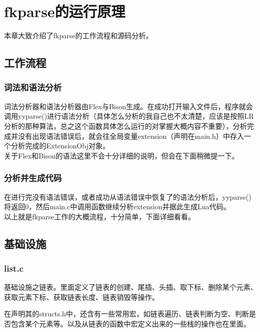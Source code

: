 \chapter{fkparse的运行原理}

本章大致介绍了fkparse的工作流程和源码分析。

\section{工作流程}

\subsection{词法和语法分析}

词法分析器和语法分析器由Flex与Bison生成。在成功打开输入文件后，程序就会调用yyparse()进行语法分析（具体怎么分析的我自己也不太清楚，应该是按照LR分析的那种算法，总之这个函数具体怎么运行的对掌握大概内容不重要），分析完成并没有出现语法错误后，就会往全局变量extension（声明在main.h）中存入一个分析完成的ExtensionObj对象。\\

关于Flex和Bison的语法这里不会十分详细的说明，但会在下面稍微提一下。

\subsection{分析并生成代码}

在进行完没有语法错误，或者成功从语法错误中恢复了的语法分析后，yyparse()将返回0，然后main.c中调用函数继续分析extension并据此生成Lua代码。\\

以上就是fkparse工作的大概流程，十分简单，下面详细看看。

\section{基础设施}

\subsection{list.c}

基础设施之链表。里面定义了链表的创建、尾插、头插、取下标、删除某个元素、获取元素下标、获取链表长度、链表销毁等操作。

在声明其的structs.h中，还含有一些常用宏，如链表遍历、链表判断为空、判断是否包含某个元素等。以及从链表的函数中宏定义出来的一些栈的操作也在里面。

